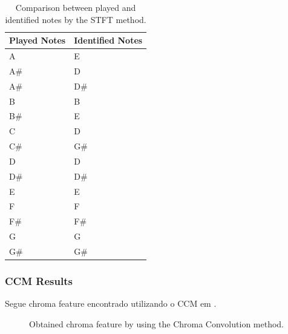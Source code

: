 \documentclass{article}
\begin{document}
	\begin{table}[h]
	 \begin{center}
	 \begin{tabular}{|l|l|}
	  \hline
	  Played Notes & Identified Notes \\
	  \hline
	  A  & E \\
	  A\#  & D \\
	  A\#  & D\# \\
	  B  & B \\
	  B\#  & E \\
	  C  & D \\
	  C\#  & G\# \\
	  D  & D \\
	  D\#  & D\# \\
	  E  & E \\
	  F  & F \\
	  F\#  & F\# \\
	  G  & G \\
	  G\#  & G\# \\
	  \hline
	 \end{tabular}
	\end{center}
	 \caption{Comparison between played and identified notes by the STFT method.}
	 \label{tab:table-1-sfft}
	\end{table}

	


	\subsubsection{CCM Results}
	Segue chroma feature encontrado utilizando o CCM em .
	
	\begin{figure}[h]
	 \centerline{}
	 \caption{Obtained chroma feature by using the Chroma Convolution method.}
	 \label{fig:1-ccm}
	\end{figure}	
\end{document}
